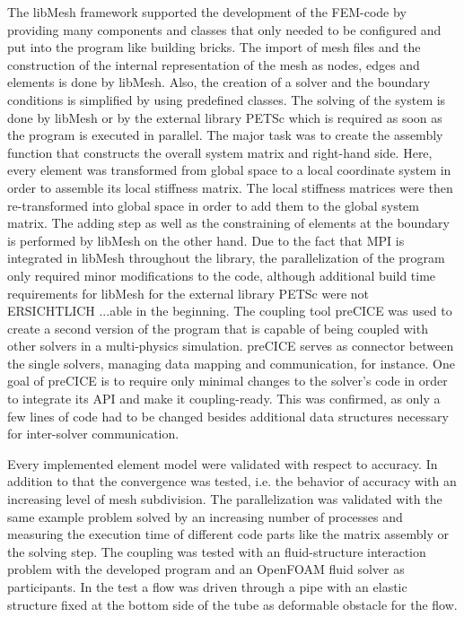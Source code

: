   The libMesh framework supported the development of the FEM-code by providing many components and classes that only needed to be configured and put into the program like building bricks. The import of mesh files and the construction of the internal representation of the mesh as nodes, edges and elements is done by libMesh. Also, the creation of a solver and the boundary conditions is simplified by using predefined classes. The solving of the system is done by libMesh or by the external library PETSc which is required as soon as the program is executed in parallel. The major task was to create the assembly function that constructs the overall system matrix and right-hand side. Here, every element was transformed from global space to a local coordinate system in order to assemble its local stiffness matrix. The local stiffness matrices were then re-transformed into global space in order to add them to the global system matrix. The adding step as well as the constraining of elements at the boundary is performed by libMesh on the other hand. Due to the fact that MPI is integrated in libMesh throughout the library, the parallelization of the program only required minor modifications to the code, although additional build time requirements for libMesh for the external library PETSc were not ERSICHTLICH ...able in the beginning. %
  The coupling tool preCICE was used to create a second version of the program that is capable of being coupled with other solvers in a multi-physics simulation. preCICE serves as connector between the single solvers, managing data mapping and communication, for instance. One goal of preCICE is to require only minimal changes to the solver's code in order to integrate its API and make it coupling-ready. This was confirmed, as only a few lines of code had to be changed besides additional data structures necessary for inter-solver communication.

  Every implemented element model were validated with respect to accuracy. In addition to that the convergence was tested, i.e. the behavior of accuracy with an increasing level of mesh subdivision. The parallelization was validated with the same example problem solved by an increasing number of processes and measuring the execution time of different code parts like the matrix assembly or the solving step. The coupling was tested with an fluid-structure interaction problem with the developed program and an OpenFOAM fluid solver as participants. In the test a flow was driven through a pipe with an elastic structure fixed at the bottom side of the tube as deformable obstacle for the flow.
 
